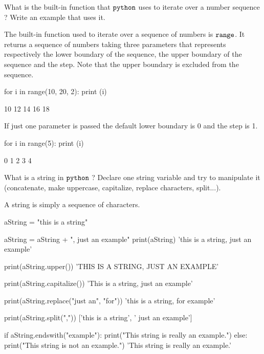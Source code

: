 \begin{question}
What is the built-in function that \(\tt{python}\) uses to iterate over a number sequence ? Write an example that uses it.
\end{question}

\cprotEnv \begin{solution}
The built-in function used to iterate over a sequence of numbers is \(\tt{range}\). It returns a sequence of numbers taking three parameters that represents respectively the lower boundary of the sequence, the upper boundary of the sequence and the step. Note that the upper boundary is excluded from the sequence.

\begin{ipython}
for i in range(10, 20, 2):
    print (i)

10
12
14
16
18
\end{ipython}
If just one parameter is passed the default lower boundary is 0 and the step is 1. 
\begin{ipython}
for i in range(5):
    print (i)
    
0
1
2
3
4
\end{ipython}
\end{solution}

\begin{question}
What is a string in \(\tt{python}\) ? Declare one string variable and try to manipulate it (concatenate, make uppercase, capitalize, replace characters, split...).
\end{question}

\cprotEnv \begin{solution}
A string is simply a sequence of characters.

\begin{ipython}
aString = "this is a string"
  
aString = aString + ", just an example"
print(aString)
'this is a string, just an example'

print(aString.upper())
'THIS IS A STRING, JUST AN EXAMPLE'

print(aString.capitalize())
'This is a string, just an example'

print(aString.replace("just an", "for"))
'this is a string, for example'

print(aString.split(","))
['this is a string', ' just an example']

if aString.endswith("example"):
    print("This string is really an example.")
else:
    print("This string is not an example.")
'This string is really an example.'
\end{ipython}
\end{solution}


